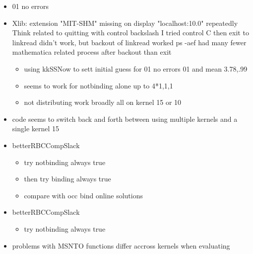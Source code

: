 \documentclass[hyperref]{labbook}
\begin{document}

\begin{itemize}
\item 01 no errors
\item Xlib:  extension "MIT-SHM" missing on display "localhost:10.0" repeatedly
Think related to quitting with control backslash  I tried  control C then exit to linkread didn't work, but backout of linkread worked  ps -aef had many fewer mathematica related process after backout than exit
  \begin{itemize}
  \item using kkSSNow to sett initial guess for 01 no errors 01 and mean 3.78,.99
  \item seems to work for notbinding alone up to 4*{1,1,1}
  \item not distributing work broadly all on kernel 15 or 10 
  \end{itemize}

\end{itemize}



\begin{itemize}
\item code seems to switch back and forth between using multiple kernels and a single kernel 15
\end{itemize}



\begin{itemize}
\item betterRBCCompSlack
  \begin{itemize}
  \item try notbinding always true
  \item then try binding always true
  \item compare with occ bind online solutions
  \end{itemize}
\end{itemize}


\begin{itemize}
\item betterRBCCompSlack
  \begin{itemize}
  \item try notbinding always true
  \end{itemize}
\end{itemize}

\begin{itemize}
\item problems with MSNTO  functions differ accross kernels when evaluating
\end{itemize}
\end{document}
